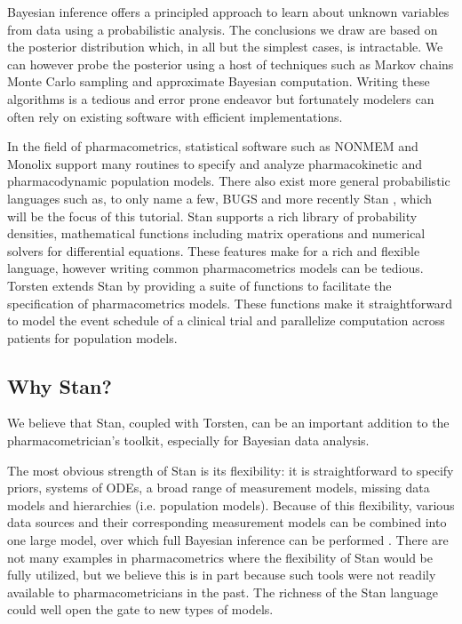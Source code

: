 
Bayesian inference offers a principled approach to learn about unknown variables from data using a probabilistic analysis.
The conclusions we draw are based on the posterior distribution which, in all but the simplest cases, is intractable.
We can however probe the posterior using a host of techniques such as Markov chains Monte Carlo sampling and approximate Bayesian computation.
Writing these algorithms is a tedious and error prone endeavor but fortunately modelers can often rely on existing software with efficient implementations.

In the field of pharmacometrics, statistical software such as NONMEM\textsuperscript{\textregistered} \cite{Beal_undated-qu} and Monolix\textsuperscript{\textregistered} \cite{monolix2021} support many routines to specify and analyze pharmacokinetic and pharmacodynamic population models.
There also exist more general probabilistic languages such as, to only name a few, BUGS \cite{lunn2009bugs} and more recently Stan \cite{Carpenter:2017}, which will be the focus of this tutorial.
Stan supports a rich library of probability densities, mathematical functions including matrix operations and numerical solvers for differential equations.
These features make for a rich and flexible language, however writing common pharmacometrics models can be tedious.
Torsten extends Stan by providing a suite of functions to facilitate the specification of pharmacometrics models.
These functions make it straightforward to model the event schedule of a clinical trial and parallelize computation across patients for population models.


\subsection{Why Stan?}

We believe that Stan, coupled with Torsten, can be an important addition to the pharmacometrician's toolkit, especially for Bayesian data analysis.

The most obvious strength of Stan is its flexibility: it is straightforward to specify priors, systems of ODEs, a broad range of measurement models, missing data models and hierarchies (i.e. population models).
Because of this flexibility, various data sources and their corresponding measurement models can be combined into one large model, over which full Bayesian inference can be performed \cite[e.g][]{Weber:2018}.
There are not many examples in pharmacometrics where the flexibility of Stan would be fully utilized, but we believe this is in part because such tools were not readily available to pharmacometricians in the past.
The richness of the Stan language could well open the gate to new types of models.


